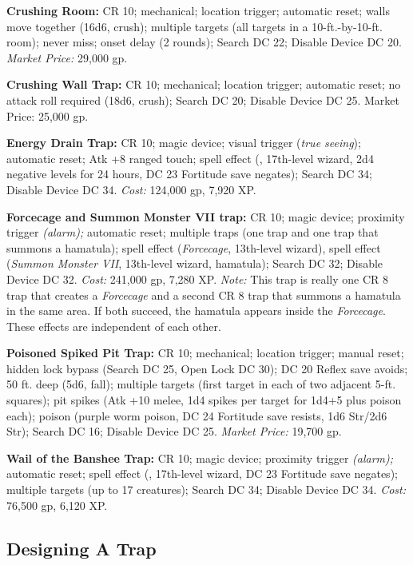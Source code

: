 \textbf{Crushing Room:} CR 10; mechanical; location trigger; automatic reset; walls 
move together (16d6, crush); multiple targets (all targets in a 10-ft.-by-10-ft. 
room); never miss; onset delay (2 rounds); Search DC 22; Disable Device DC 20. 
\textit{Market Price:} 29,000 gp.

\textbf{Crushing Wall Trap:} CR 10; mechanical; location trigger; automatic reset; 
no attack roll required (18d6, crush); Search DC 20; Disable Device DC 25. Market 
Price: 25,000 gp. 

\textbf{Energy Drain Trap:} CR 10; magic device; visual trigger 
(\textit{true seeing}); automatic reset; Atk +8 ranged touch; spell effect (, 
17th-level wizard, 2d4 negative levels for 24 hours, DC 23 Fortitude save 
negates); Search DC 34; Disable Device DC 34. \textit{Cost:} 124,000 gp, 7,920 
XP.

\textbf{Forcecage and Summon Monster VII trap:} 
CR 10; magic device; proximity trigger \textit{(alarm); }automatic reset; multiple 
traps (one  trap and one  trap that 
summons a hamatula); spell effect (\textit{Forcecage}, 13th-level wizard), spell 
effect (\textit{Summon Monster VII}, 13th-level wizard, hamatula); Search DC 32; 
Disable Device DC 32. \textit{Cost:} 241,000 gp, 7,280 XP. \textit{Note:} This 
trap is really one CR 8 trap that creates a \textit{Forcecage} and a second CR 
8 trap that summons a hamatula in the same area. If both succeed, the hamatula 
appears inside the \textit{Forcecage}. These effects are independent of each other.

\textbf{Poisoned Spiked Pit Trap:} CR 10; mechanical; location trigger; manual 
reset; hidden lock bypass (Search DC 25, Open Lock DC 30); DC 20 Reflex save avoids; 
50 ft. deep (5d6, fall); multiple targets (first target in each of two adjacent 
5-ft. squares); pit spikes (Atk +10 melee, 1d4 spikes per target for 1d4+5 plus 
poison each); poison (purple worm poison, DC 24 Fortitude save resists, 1d6 Str/2d6 
Str); Search DC 16; Disable Device DC 25. \textit{Market Price:} 19,700 gp. 

\textbf{Wail of the Banshee Trap:} CR 10; magic device; proximity 
trigger \textit{(alarm); }automatic reset; spell effect (,
17th-level wizard, DC 23 Fortitude save negates); multiple targets (up to 17 creatures); 
Search DC 34; Disable Device DC 34. \textit{Cost:} 76,500 gp, 6,120 XP.

\subsection{Designing A Trap}

